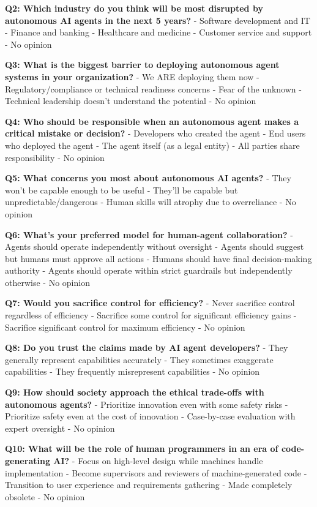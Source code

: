 \documentclass{article}
\begin{document}
\textbf{Q2: Which industry do you think will be most disrupted by
	autonomous AI agents in the next 5 years?} - Software development and IT
- Finance and banking - Healthcare and medicine - Customer service and
support - No opinion

\textbf{Q3: What is the biggest barrier to deploying autonomous agent
	systems in your organization?} - We ARE deploying them now -
Regulatory/compliance or technical readiness concerns - Fear of the
unknown - Technical leadership doesn't understand the potential - No
opinion

\textbf{Q4: Who should be responsible when an autonomous agent makes a
	critical mistake or decision?} - Developers who created the agent - End
users who deployed the agent - The agent itself (as a legal entity) -
All parties share responsibility - No opinion

\textbf{Q5: What concerns you most about autonomous AI agents?} - They
won't be capable enough to be useful - They'll be capable but
unpredictable/dangerous - Human skills will atrophy due to overreliance
- No opinion

\textbf{Q6: What's your preferred model for human-agent collaboration?}
- Agents should operate independently without oversight - Agents should
suggest but humans must approve all actions - Humans should have final
decision-making authority - Agents should operate within strict
guardrails but independently otherwise - No opinion

\textbf{Q7: Would you sacrifice control for efficiency?} - Never
sacrifice control regardless of efficiency - Sacrifice some control for
significant efficiency gains - Sacrifice significant control for maximum
efficiency - No opinion

\textbf{Q8: Do you trust the claims made by AI agent developers?} - They
generally represent capabilities accurately - They sometimes exaggerate
capabilities - They frequently misrepresent capabilities - No opinion

\textbf{Q9: How should society approach the ethical trade-offs with
	autonomous agents?} - Prioritize innovation even with some safety risks
- Prioritize safety even at the cost of innovation - Case-by-case
evaluation with expert oversight - No opinion

\textbf{Q10: What will be the role of human programmers in an era of
	code-generating AI?} - Focus on high-level design while machines handle
implementation - Become supervisors and reviewers of machine-generated
code - Transition to user experience and requirements gathering - Made
completely obsolete - No opinion
\end{document}
